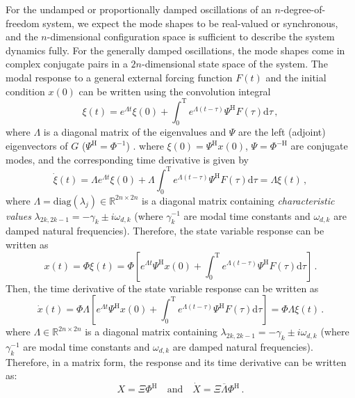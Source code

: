 \documentclass[10pt]{article}
\begin{document}
For the undamped or proportionally damped oscillations of an $n$-degree-of-freedom system, we expect the mode shapes to be real-valued or synchronous, and the $n$-dimensional configuration space is sufficient to describe the system dynamics fully.
For the generally damped oscillations, the mode shapes come in complex conjugate pairs in a $2n$-dimensional state space of the system.
The modal response to a general external forcing function $F(t)$ and the initial condition $x(0)$ can be written using the convolution integral
\begin{equation}
	\xi(t) = e^{\Lambda t} \xi(0) + \int_0^\mathrm{T} e^{\Lambda(t-\tau)} \Psi^\mathrm{H} F(\tau) \mathrm{d} \tau\,,
\end{equation}
where $\Lambda$ is a diagonal matrix of the eigenvalues and $\Psi$ are the left (adjoint) eigenvectors of $G$ ($\Psi^\mathrm{H} = \Phi^{-1}$) .
where $\xi(0) = \Psi^\mathrm{H} x(0)$, $\Psi = \Phi^{-\mathrm{H}}$ are conjugate modes, and the corresponding time derivative is given by
\begin{equation}
	\dot \xi(t) = \Lambda e^{\Lambda t} \xi(0) + \Lambda \int_0^\mathrm{T} e^{\Lambda(t-\tau)} \Psi^\mathrm{H} F(\tau) \mathrm{d} \tau = \Lambda \xi(t)\,,
\end{equation}
where $\Lambda = \mathrm{diag} \left( \lambda_j \right)\in \mathbb{R}^{2n\times 2n}$ is a diagonal matrix containing {\em characteristic values} $\lambda_{2k,2k-1}=-\gamma_k\pm i \omega_{d,k}$ (where $\gamma_k^{-1}$ are modal time constants and $\omega_{d,k}$ are damped natural frequencies).
Therefore, the state variable response can be written as
\begin{equation}
	x(t) = \Phi \xi(t) = \Phi \left[ e^{\Lambda t}\Psi^\mathrm{H}x(0) + \int_0^\mathrm{T} e^{\Lambda(t-\tau)} \Psi^\mathrm{H} F(\tau) \mathrm{d} \tau\right] \,.
\end{equation}
Then, the time derivative of the state variable response can be written as
\begin{equation}
	\dot x(t) = \Phi \Lambda \left[ e^{\Lambda t}  \Psi^\mathrm{H}x(0) + \int_0^\mathrm{T} e^{\Lambda(t-\tau)}  \Psi^\mathrm{H} F(\tau) \mathrm{d} \tau\right]=\Phi\Lambda \xi(t) \,.
\end{equation}
where $\Lambda\in \mathbb{R}^{2n\times 2n}$ is a diagonal matrix containing $\lambda_{2k,2k-1}=-\gamma_k\pm i \omega_{d,k}$ (where $\gamma_k^{-1}$ are modal time constants and $\omega_{d,k}$ are damped natural frequencies).
Therefore, in a matrix form, the response and its time derivative can be written as:
\begin{equation}\label{dmodal}
	X = \Xi \Phi^\mathrm{H} \quad \mathrm{and} \quad \dot X = \Xi \overline{\Lambda} 
	\Phi^\mathrm{H}\,.
\end{equation}
\end{document}
